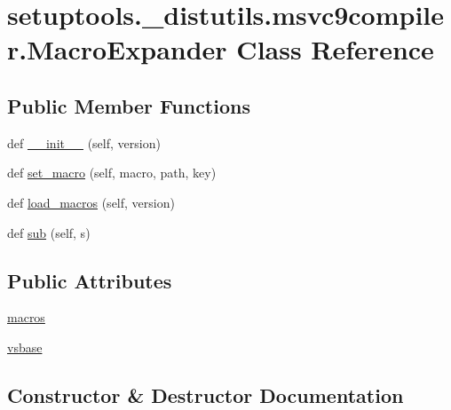 \hypertarget{classsetuptools_1_1__distutils_1_1msvc9compiler_1_1MacroExpander}{}\section{setuptools.\+\_\+distutils.\+msvc9compiler.\+Macro\+Expander Class Reference}
\label{classsetuptools_1_1__distutils_1_1msvc9compiler_1_1MacroExpander}
\subsection*{Public Member Functions}
\begin{DoxyCompactItemize}
\item 
def \hyperlink{classsetuptools_1_1__distutils_1_1msvc9compiler_1_1MacroExpander_a401911422d68e877d84f4fe8b77f6055}{\+\_\+\+\_\+init\+\_\+\+\_\+} (self, version)
\item 
def \hyperlink{classsetuptools_1_1__distutils_1_1msvc9compiler_1_1MacroExpander_aea050236c36503a9e357897e51ab0961}{set\+\_\+macro} (self, macro, path, key)
\item 
def \hyperlink{classsetuptools_1_1__distutils_1_1msvc9compiler_1_1MacroExpander_a8882af7f9b5ab83e12c2dd01e279806f}{load\+\_\+macros} (self, version)
\item 
def \hyperlink{classsetuptools_1_1__distutils_1_1msvc9compiler_1_1MacroExpander_a0fd5357e9f82249382c61d774821c004}{sub} (self, s)
\end{DoxyCompactItemize}
\subsection*{Public Attributes}
\begin{DoxyCompactItemize}
\item 
\hyperlink{classsetuptools_1_1__distutils_1_1msvc9compiler_1_1MacroExpander_a6b13d636900ae4acedea520f255935aa}{macros}
\item 
\hyperlink{classsetuptools_1_1__distutils_1_1msvc9compiler_1_1MacroExpander_aa470503f0f0d295d0d6f11c9e9440d8d}{vsbase}
\end{DoxyCompactItemize}


\subsection{Constructor \& Destructor Documentation}
\mbox{\label{classsetuptools_1_1__distutils_1_1msvc9compiler_1_1MacroExpander_a401911422d68e877d84f4fe8b77f6055}} 
